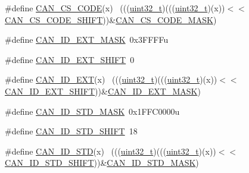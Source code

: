 \begin{DoxyCompactItemize}
\item 
\#define \hyperlink{group___c_a_n___register___masks_ga79532eda4eb8b2aae247a9ad6b651039}{C\+A\+N\+\_\+\+C\+S\+\_\+\+C\+O\+DE}(x)                                                  ~(((\hyperlink{_p_e___types_8h_a33594304e786b158f3fb30289278f5af}{uint32\+\_\+t})(((\hyperlink{_p_e___types_8h_a33594304e786b158f3fb30289278f5af}{uint32\+\_\+t})(x))$<$$<$\hyperlink{group___c_a_n___register___masks_ga58e7e6f814f9a6f5fa03974e3f4d7e34}{C\+A\+N\+\_\+\+C\+S\+\_\+\+C\+O\+D\+E\+\_\+\+S\+H\+I\+FT}))\&\hyperlink{group___c_a_n___register___masks_gadff04787b30174d22d7955037c850b7c}{C\+A\+N\+\_\+\+C\+S\+\_\+\+C\+O\+D\+E\+\_\+\+M\+A\+SK})
\item 
\#define \hyperlink{group___c_a_n___register___masks_gacd238d5b88bd71a60ff7c00da7427be7}{C\+A\+N\+\_\+\+I\+D\+\_\+\+E\+X\+T\+\_\+\+M\+A\+SK}~0x3\+F\+F\+F\+Fu
\item 
\#define \hyperlink{group___c_a_n___register___masks_gadd4a0522a5d856f631a2812cc8fe909c}{C\+A\+N\+\_\+\+I\+D\+\_\+\+E\+X\+T\+\_\+\+S\+H\+I\+FT}~0
\item 
\#define \hyperlink{group___c_a_n___register___masks_gaccea7da4e886b7bb3cf592e5c5b81e67}{C\+A\+N\+\_\+\+I\+D\+\_\+\+E\+XT}(x)                                                    ~(((\hyperlink{_p_e___types_8h_a33594304e786b158f3fb30289278f5af}{uint32\+\_\+t})(((\hyperlink{_p_e___types_8h_a33594304e786b158f3fb30289278f5af}{uint32\+\_\+t})(x))$<$$<$\hyperlink{group___c_a_n___register___masks_gadd4a0522a5d856f631a2812cc8fe909c}{C\+A\+N\+\_\+\+I\+D\+\_\+\+E\+X\+T\+\_\+\+S\+H\+I\+FT}))\&\hyperlink{group___c_a_n___register___masks_gacd238d5b88bd71a60ff7c00da7427be7}{C\+A\+N\+\_\+\+I\+D\+\_\+\+E\+X\+T\+\_\+\+M\+A\+SK})
\item 
\#define \hyperlink{group___c_a_n___register___masks_ga35a257f1f6dd8ee576becf1f05e995c2}{C\+A\+N\+\_\+\+I\+D\+\_\+\+S\+T\+D\+\_\+\+M\+A\+SK}~0x1\+F\+F\+C0000u
\item 
\#define \hyperlink{group___c_a_n___register___masks_gae8834f24b0aac84530ffd22f683ef5b4}{C\+A\+N\+\_\+\+I\+D\+\_\+\+S\+T\+D\+\_\+\+S\+H\+I\+FT}~18
\item 
\#define \hyperlink{group___c_a_n___register___masks_ga12697f8d73c24a6dae455576db8d7ac0}{C\+A\+N\+\_\+\+I\+D\+\_\+\+S\+TD}(x)                                                    ~(((\hyperlink{_p_e___types_8h_a33594304e786b158f3fb30289278f5af}{uint32\+\_\+t})(((\hyperlink{_p_e___types_8h_a33594304e786b158f3fb30289278f5af}{uint32\+\_\+t})(x))$<$$<$\hyperlink{group___c_a_n___register___masks_gae8834f24b0aac84530ffd22f683ef5b4}{C\+A\+N\+\_\+\+I\+D\+\_\+\+S\+T\+D\+\_\+\+S\+H\+I\+FT}))\&\hyperlink{group___c_a_n___register___masks_ga35a257f1f6dd8ee576becf1f05e995c2}{C\+A\+N\+\_\+\+I\+D\+\_\+\+S\+T\+D\+\_\+\+M\+A\+SK})
$$
\end{DoxyCompactItemize}
